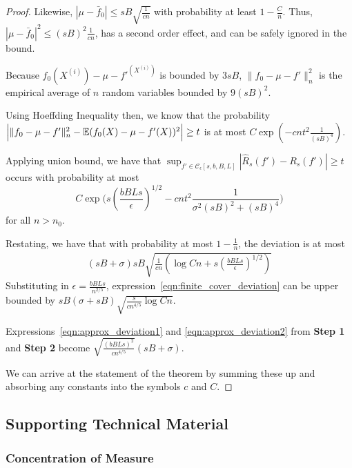 \begin{proof}
Likewise, $| \mu - \bar{f}_0 | \leq sB \sqrt{\frac{1}{cn}}$ with probability at least $1-\frac{C}{n}$. Thus, $| \mu - \bar{f}_0 |^2 \leq (sB)^2 \frac{1}{cn}$, has a second order effect, and can be safely ignored in the bound.

Because $f_0(X^{(i)}) -\mu - f'^(X^{(i)})$ is bounded by $3sB$, $\| f_0 -\mu- f'\|_n^2$ is the empirical average of $n$ random variables bounded by $9(sB)^2$. 

Using Hoeffding Inequality then, we know that the probability $\Big| \| f_0 -\mu - f' \|_n^2 - {\mathbb E}(f_0(X) -\mu - f '(X))^2 \Big| \geq t $ is at most $C \exp( - c n t^2 \frac{1}{(sB)^4})$. 

Applying union bound, we have that $\sup_{f' \in \mathcal{C}_\epsilon[s,b,B,L]} | \hat{R}_s(f') - R_s(f') | \geq t$ occurs with probability at most
\[
C \exp\big( s\left( \frac{bBLs}{\epsilon} \right)^{1/2} - c n t^2 \frac{1}{\sigma^2(sB)^2 + (sB)^4} \big)
\]
for all $n > n_0$.

Restating, we have that with probability at most $1- \frac{1}{n}$, the deviation is at most 
\begin{align}
(sB+\sigma)sB\sqrt{ \frac{1}{cn} \left( \log Cn + s( \frac{bBLs}{\epsilon})^{1/2} \right)} \label{eqn:finite_cover_deviation}
\end{align}
Substituting in $\epsilon = \frac{bBLs}{n^{2/5}}$, expression~\ref{eqn:finite_cover_deviation} can be upper bounded by $sB(\sigma+sB)\sqrt{ \frac{s}{cn^{4/5}} \log Cn}$.

Expressions~\ref{eqn:approx_deviation1} and \ref{eqn:approx_deviation2} from \textbf{Step 1} and \textbf{Step 2} become $\sqrt{ \frac{(bBLs)^2}{cn^{4/5}}} (sB+\sigma)$.

We can arrive at the statement of the theorem by summing these up and absorbing any constants into the symbols $c$ and $C$.

\end{proof}
 
 
 
 
 
 
 
 \subsection{Supporting Technical Material}
 
 \subsubsection{Concentration of Measure}


